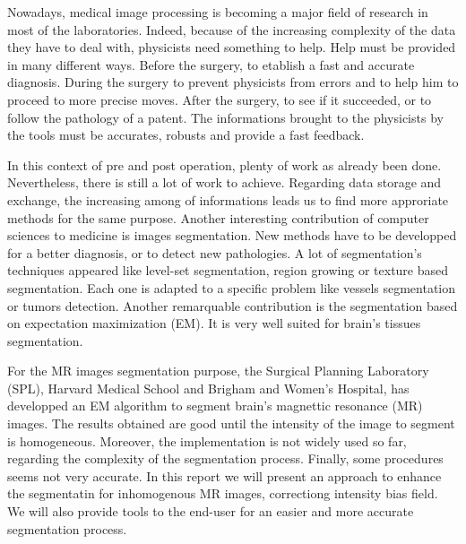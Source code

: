Nowadays, medical image processing is becoming a major field of research in most of the laboratories. Indeed, because of the increasing complexity of the data they have to deal with,  physicists need something to help. Help must be provided in many different ways. Before the surgery, to etablish a fast and accurate diagnosis. During the surgery to prevent physicists from errors and to help him to proceed to more precise moves. After the surgery, to see if it succeeded, or to follow the pathology of a patent. The informations brought to the physicists by the tools must be accurates, robusts and provide a fast feedback.
%
\par
%
In this context of pre and post operation, plenty of work as already been done. Nevertheless, there is still a lot of work to achieve. Regarding data storage and exchange, the increasing among of informations leads us to find more approriate methods for the same purpose. Another interesting contribution of computer sciences to medicine is images segmentation. New methods have to be developped for a better diagnosis, or to detect new pathologies. A lot of segmentation's techniques appeared like level-set segmentation, region growing or texture based segmentation. Each one is adapted to a specific problem like vessels segmentation or tumors detection. Another remarquable contribution is the segmentation based on expectation maximization (EM). It is very well suited for brain's tissues segmentation. 
%
\par
%
For the MR images segmentation purpose, the Surgical Planning Laboratory (SPL), Harvard Medical School and Brigham and Women's Hospital, has developped an EM algorithm to segment brain's magnettic resonance (MR) images. The results obtained are good until the intensity of the image to segment is homogeneous. Moreover, the implementation is not widely used so far, regarding the complexity of the segmentation process. Finally, some procedures seems not very accurate. In this report we will present an approach to enhance the segmentatin for inhomogenous MR images, correctiong intensity bias field. We will also provide tools to the end-user for an easier and more accurate segmentation process.
%
